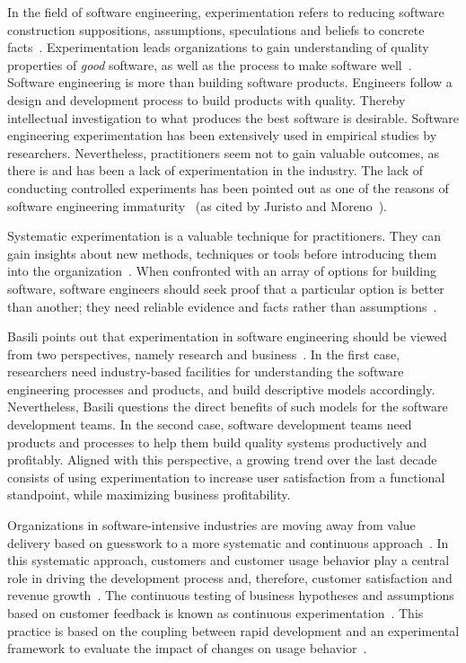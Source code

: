 In the field of software engineering, experimentation refers to reducing software construction suppositions, assumptions, speculations and beliefs to concrete facts~\cite{juristo-2013-basics}. Experimentation leads organizations to gain understanding of quality properties of \emph{good} software, as well as the process to make software well~\cite{pfleeger-1999-albert}. Software engineering is more than building software products. Engineers follow a design and development process to build products with quality. Thereby intellectual investigation to what produces the best software is desirable. Software engineering experimentation has been extensively used in empirical studies by researchers. Nevertheless, practitioners seem not to gain valuable outcomes, as there is and has been a lack of experimentation in the industry. The lack of conducting controlled experiments has been pointed out as one of the reasons of software engineering immaturity~\cite{ebert-1997-road} (as cited by Juristo and Moreno~\cite{juristo-2013-basics}).

Systematic experimentation is a valuable technique for practitioners. They can gain insights about new methods, techniques or tools before introducing them into the organization~\cite{wohlin-2012-experimentation}. When confronted with an array of options for building software, software engineers should seek proof that a particular option is better than another; they need reliable evidence and facts rather than assumptions~\cite{juristo-2013-basics}.

Basili points out that experimentation in software engineering should be viewed from two perspectives, namely research and business~\cite{basili-1993-experimental}. In the first case, researchers need industry-based facilities for understanding the software engineering processes and products, and build descriptive models accordingly. Nevertheless, Basili questions the direct benefits of such models for the software development teams. In the second case, software development teams need products and processes to help them build quality systems productively and profitably. Aligned with this perspective, a growing trend over the last decade consists of using experimentation to increase user satisfaction from a functional standpoint, while maximizing business profitability.%

Organizations in software-intensive industries are moving away from value delivery based on guesswork to a more systematic and continuous approach~\cite{fagerholm-2014-building}. In this systematic approach, customers and customer usage behavior play a central role in driving the development process and, therefore, customer satisfaction and revenue growth~\cite{bosh-2012-building,fabian-2017-right}. The continuous testing of business hypotheses and assumptions based on customer feedback is known as continuous experimentation~\cite{fagerholm-2014-building,kevic-2017-characterizing}. This practice is based on the coupling between rapid development and an experimental framework to evaluate the impact of changes on usage behavior~\cite{kevic-2017-characterizing}.

